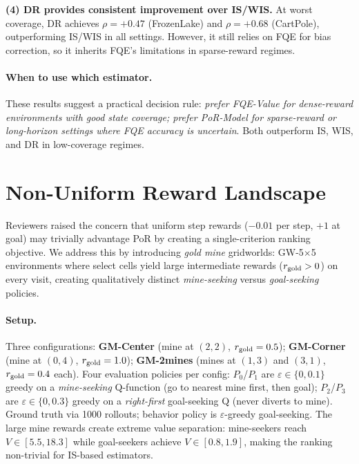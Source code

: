 \documentclass[10pt]{article}
\theoremstyle{plain}
\theoremstyle{definition}
\theoremstyle{remark}
\begin{document}
\textbf{(4) DR provides consistent improvement over IS/WIS.}  At worst
coverage, DR achieves $\rho=+0.47$ (FrozenLake) and $\rho=+0.68$
(CartPole), outperforming IS/WIS in all settings.  However, it still
relies on FQE for bias correction, so it inherits FQE's limitations in
sparse-reward regimes.

\paragraph{When to use which estimator.}
These results suggest a practical decision rule: \emph{prefer FQE-Value
for dense-reward environments with good state coverage; prefer PoR-Model
for sparse-reward or long-horizon settings where FQE accuracy is uncertain}.
Both outperform IS, WIS, and DR in low-coverage regimes.

\section{Non-Uniform Reward Landscape}
\label{sec:goldmine}

Reviewers raised the concern that uniform step rewards ($-0.01$ per step,
$+1$ at goal) may trivially advantage PoR by creating a single-criterion
ranking objective.  We address this by introducing \emph{gold mine} gridworlds:
GW-5$\times$5 environments where select cells yield large intermediate rewards
($r_{\rm gold}>0$) on every visit, creating qualitatively distinct
\emph{mine-seeking} versus \emph{goal-seeking} policies.

\paragraph{Setup.}
Three configurations: \textbf{GM-Center} (mine at $(2,2)$, $r_{\rm gold}=0.5$);
\textbf{GM-Corner} (mine at $(0,4)$, $r_{\rm gold}=1.0$); \textbf{GM-2mines}
(mines at $(1,3)$ and $(3,1)$, $r_{\rm gold}=0.4$ each).
Four evaluation policies per config: $P_0$/$P_1$ are $\varepsilon\in\{0,0.1\}$
greedy on a \emph{mine-seeking} Q-function (go to nearest mine first, then goal);
$P_2$/$P_3$ are $\varepsilon\in\{0,0.3\}$ greedy on a \emph{right-first}
goal-seeking Q (never diverts to mine).  Ground truth via 1000 rollouts;
behavior policy is $\varepsilon$-greedy goal-seeking.  The large mine rewards
create extreme value separation: mine-seekers reach $V\in[5.5,18.3]$ while
goal-seekers achieve $V\in[0.8,1.9]$, making the ranking non-trivial for
IS-based estimators.
\end{document}
